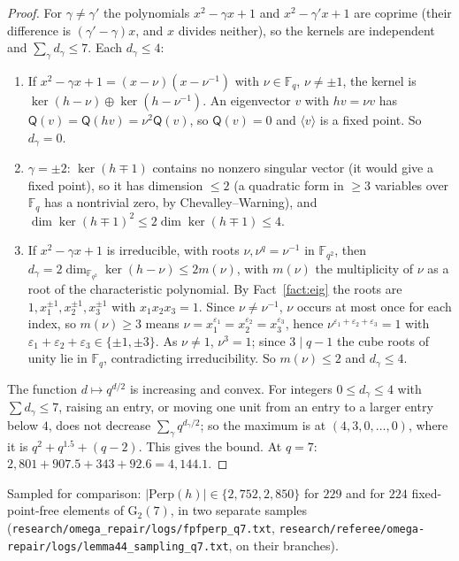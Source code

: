\documentclass[11pt]{amsart}
\newcommand{\file}[1]{\nolinkurl{#1}}
\theoremstyle{plain}
\theoremstyle{definition}
\theoremstyle{remark}
\newcommand{\F}{\mathbb{F}}
\newcommand{\Q}{\mathsf{Q}}
\newcommand{\Perp}{\mathrm{Perp}}
\newcommand{\GG}{\mathrm{G}_2}
\begin{document}
\begin{proof}
For $\gamma \ne \gamma'$ the polynomials $x^2 - \gamma x + 1$ and $x^2 - \gamma' x + 1$ are coprime (their difference is
$(\gamma' - \gamma)x$, and $x$ divides neither), so the kernels are independent and $\sum_\gamma d_\gamma \le 7$. Each
$d_\gamma \le 4$:
\begin{enumerate}[label=(\roman*)]
\item If $x^2 - \gamma x + 1 = (x - \nu)(x - \nu^{-1})$ with $\nu \in \F_q$, $\nu \ne \pm1$, the kernel is
  $\ker(h - \nu) \oplus \ker(h - \nu^{-1})$. An eigenvector $v$ with $hv = \nu v$ has $\Q(v) = \Q(hv) = \nu^2\Q(v)$, so
  $\Q(v) = 0$ and $\langle v\rangle$ is a fixed point. So $d_\gamma = 0$.
\item $\gamma = \pm 2$: $\ker(h \mp 1)$ contains no nonzero singular vector (it would give a fixed point), so it has
  dimension $\le 2$ (a quadratic form in $\ge 3$ variables over $\F_q$ has a nontrivial zero, by Chevalley--Warning), and
  $\dim\ker(h \mp 1)^2 \le 2\dim\ker(h \mp 1) \le 4$.
\item If $x^2 - \gamma x + 1$ is irreducible, with roots $\nu, \nu^q = \nu^{-1}$ in $\F_{q^2}$, then
  $d_\gamma = 2\dim_{\F_{q^2}}\ker(h - \nu) \le 2m(\nu)$, with $m(\nu)$ the multiplicity of $\nu$ as a root of the
  characteristic polynomial. By Fact~\ref{fact:eig} the roots are $1, x_1^{\pm1}, x_2^{\pm1}, x_3^{\pm1}$ with
  $x_1x_2x_3 = 1$. Since $\nu \ne \nu^{-1}$, $\nu$ occurs at most once for each index, so $m(\nu) \ge 3$ means
  $\nu = x_1^{\varepsilon_1} = x_2^{\varepsilon_2} = x_3^{\varepsilon_3}$, hence $\nu^{\varepsilon_1+\varepsilon_2+\varepsilon_3}
  = 1$ with $\varepsilon_1+\varepsilon_2+\varepsilon_3 \in \{\pm1, \pm3\}$. As $\nu \ne 1$, $\nu^3 = 1$; since
  $3 \mid q-1$ the cube roots of unity lie in $\F_q$, contradicting irreducibility. So $m(\nu) \le 2$ and $d_\gamma \le 4$.
\end{enumerate}
The function $d \mapsto q^{d/2}$ is increasing and convex. For integers $0 \le d_\gamma \le 4$ with
$\sum d_\gamma \le 7$, raising an entry, or moving one unit from an entry to a larger entry below $4$, does not decrease
$\sum_\gamma q^{d_\gamma/2}$; so the maximum is at $(4, 3, 0, \dots, 0)$, where it is $q^2 + q^{1.5} + (q-2)$. This gives
the bound. At $q = 7$: $2{,}801 + 907.5 + 343 + 92.6 = 4{,}144.1$.
\end{proof}

Sampled for comparison: $|\Perp(h)| \in \{2{,}752, 2{,}850\}$ for $229$ and for $224$ fixed-point-free elements of
$\GG(7)$, in two separate samples (\file{research/omega_repair/logs/fpfperp_q7.txt},
\file{research/referee/omega-repair/logs/lemma44_sampling_q7.txt}, on their branches).
\end{document}
